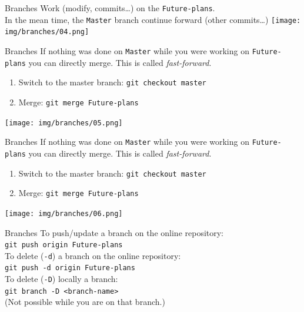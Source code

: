 \documentclass[usenames,dvipsnames,9pt]{beamer}
\begin{document}
\begin{frame}{Branches}
Work (modify, commits\ldots) on the \texttt{Future-plans}.\\
In the mean time, the \texttt{Master} branch continue forward (other commits\ldots)
\texttt{[image: img/branches/04.png]}
\end{frame}


\begin{frame}{Branches}
If nothing was done on \texttt{Master} while you were working on \texttt{Future-plans} you can directly merge. This is called \emph{fast-forward}.
\begin{enumerate}
  \item Switch to the master branch: \lstinline|git checkout master|
  \item Merge: \lstinline|git merge Future-plans|
\end{enumerate}
\vspace{-1cm}
\texttt{[image: img/branches/05.png]}
\end{frame}

\begin{frame}{Branches}
\vspace{0.2cm}
If nothing was done on \texttt{Master} while you were working on \texttt{Future-plans} you can directly merge. This is called \emph{fast-forward}.
\begin{enumerate}
  \item Switch to the master branch: \lstinline|git checkout master|
  \item Merge: \lstinline|git merge Future-plans|
\end{enumerate}
\vspace{-0.8cm}
\hspace{0.07cm}\texttt{[image: img/branches/06.png]}
\end{frame}

\begin{frame}{Branches}
  \centering
  To push/update a branch on the online repository:\\
  \lstinline|git push origin Future-plans|\\
  \vspace{1cm}
  To delete (\lstinline|-d|) a branch on the online repository:\\
  \lstinline|git push -d origin Future-plans|\\
  \vspace{1cm}
  To delete (\lstinline|-D|) locally a branch:\\
  \lstinline|git branch -D <branch-name>|\\
  (Not possible while you are on that branch.)
\end{frame}
\end{document}
